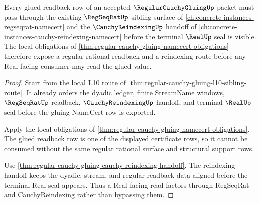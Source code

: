 \begin{theorem}
\label{thm:regular-cauchy-gluing-regseqrat-route}
Every glued readback row of an accepted $\RegularCauchyGluingUp$ packet must pass through the existing $\RegSeqRatUp$ sibling surface of \autoref{ch:concrete-instances-regseqrat-namecert} and the $\CauchyReindexingUp$ handoff of \autoref{ch:concrete-instances-cauchy-reindexing-namecert} before the terminal $\RealUp$ seal is visible. The local obligations of \autoref{thm:regular-cauchy-gluing-namecert-obligations} therefore expose a regular rational readback and a reindexing route before any Real-facing consumer may read the glued value.
\end{theorem}
\begin{proof}
Start from the local L10 route of \autoref{thm:regular-cauchy-gluing-l10-sibling-route}. It already orders the dyadic ledger, finite StreamName windows, $\RegSeqRatUp$ readback, $\CauchyReindexingUp$ handoff, and terminal $\RealUp$ seal before the gluing NameCert row is exported.

Apply the local obligations of \autoref{thm:regular-cauchy-gluing-namecert-obligations}. The glued readback row is one of the displayed certificate rows, so it cannot be consumed without the same regular rational surface and structural support rows.

Use \autoref{thm:regular-cauchy-gluing-cauchy-reindexing-handoff}. The reindexing handoff keeps the dyadic, stream, and regular readback data aligned before the terminal Real seal appears. Thus a Real-facing read factors through RegSeqRat and CauchyReindexing rather than bypassing them.
\end{proof}

